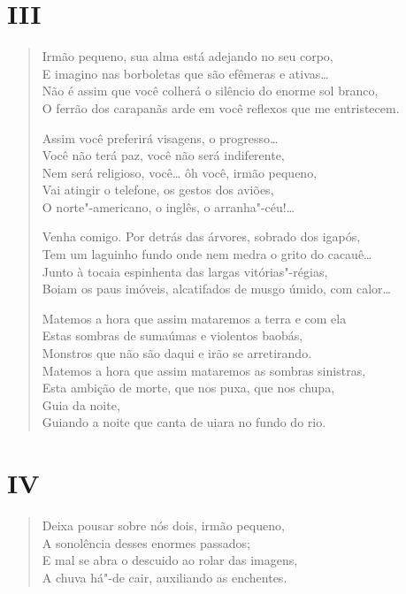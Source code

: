 {\medskip
\section*{III}

\begin{verse}
Irmão pequeno, sua alma está adejando no seu corpo,\\
E imagino nas borboletas que são efêmeras e ativas\ldots{}\\
Não é assim que você colherá o silêncio do enorme sol branco,\\
O ferrão dos carapanãs arde em você reflexos que me entristecem.

Assim você preferirá visagens, o progresso\ldots{}\\
Você não terá paz, você não será indiferente,\\
Nem será religioso, você\ldots{} ôh você, irmão pequeno,\\
Vai atingir o telefone, os gestos dos aviões,\\
O norte"-americano, o inglês, o arranha"-céu!\ldots{}

Venha comigo. Por detrás das árvores, sobrado dos igapós,\\
Tem um laguinho fundo onde nem medra o grito do cacauê\ldots{}\\
Junto à tocaia espinhenta das largas vitórias"-régias,\\
Boiam os paus imóveis, alcatifados de musgo úmido, com calor\ldots{}

Matemos a hora que assim mataremos a terra e com ela\\
Estas sombras de sumaúmas e violentos baobás,\\
Monstros que não são daqui e irão se arretirando.\\
Matemos a hora que assim mataremos as sombras sinistras,\\
Esta ambição de morte, que nos puxa, que nos chupa,\\
Guia da noite,\\
Guiando a noite que canta de uiara no fundo do rio.
\end{verse}

\medskip
\section*{IV}

\begin{verse}
Deixa pousar sobre nós dois, irmão pequeno,\\
A sonolência desses enormes passados;\\
E mal se abra o descuido ao rolar das imagens,\\
A chuva há"-de cair, auxiliando as enchentes.


\end{verse}}
